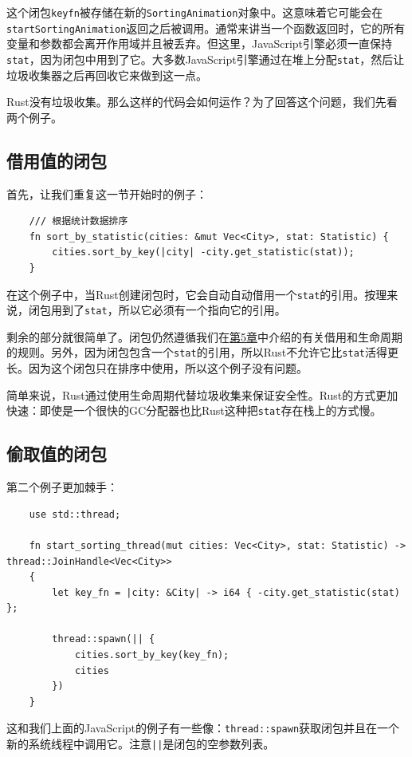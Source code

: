 这个闭包\texttt{keyfn}被存储在新的\texttt{SortingAnimation}对象中。这意味着它可能会在\texttt{startSortingAnimation}返回之后被调用。通常来讲当一个函数返回时，它的所有变量和参数都会离开作用域并且被丢弃。但这里，JavaScript引擎必须一直保持\texttt{stat}，因为闭包中用到了它。大多数JavaScript引擎通过在堆上分配\texttt{stat}，然后让垃圾收集器之后再回收它来做到这一点。

Rust没有垃圾收集。那么这样的代码会如何运作？为了回答这个问题，我们先看两个例子。

\subsection{借用值的闭包}
首先，让我们重复这一节开始时的例子：
\begin{verbatim}
    /// 根据统计数据排序
    fn sort_by_statistic(cities: &mut Vec<City>, stat: Statistic) {
        cities.sort_by_key(|city| -city.get_statistic(stat));
    }
\end{verbatim}

在这个例子中，当Rust创建闭包时，它会自动自动借用一个\texttt{stat}的引用。按理来说，闭包用到了\texttt{stat}，所以它必须有一个指向它的引用。

剩余的部分就很简单了。闭包仍然遵循我们在\hyperref[ch05]{第5章}中介绍的有关借用和生命周期的规则。另外，因为闭包包含一个\texttt{stat}的引用，所以Rust不允许它比\texttt{stat}活得更长。因为这个闭包只在排序中使用，所以这个例子没有问题。

简单来说，Rust通过使用生命周期代替垃圾收集来保证安全性。Rust的方式更加快速：即使是一个很快的GC分配器也比Rust这种把\texttt{stat}存在栈上的方式慢。

\subsection{偷取值的闭包}\label{StealClosure}
第二个例子更加棘手：
\begin{verbatim}
    use std::thread;

    fn start_sorting_thread(mut cities: Vec<City>, stat: Statistic) -> thread::JoinHandle<Vec<City>>
    {
        let key_fn = |city: &City| -> i64 { -city.get_statistic(stat) };

        thread::spawn(|| {
            cities.sort_by_key(key_fn);
            cities
        })
    }
\end{verbatim}

这和我们上面的JavaScript的例子有一些像：\texttt{thread::spawn}获取闭包并且在一个新的系统线程中调用它。注意\texttt{||}是闭包的空参数列表。

